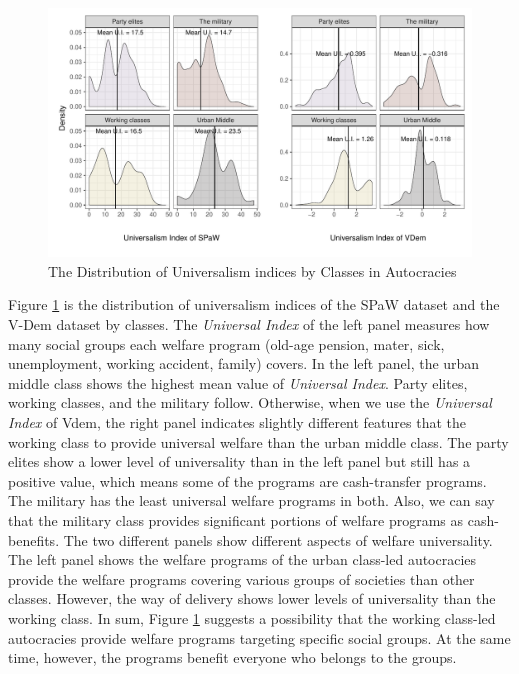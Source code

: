 \documentclass[11pt, notitlepage]{article}
\begin{document}
\begin{figure}[!htbt]
	\centering
	\includegraphics[width=1\linewidth]{"../3. Datasets_Codebooks/Figures/Plot2"}
	\caption{The Distribution of Universalism indices by Classes in Autocracies}
	\label{fig:plot3}
\end{figure}

Figure \ref{fig:plot3} is the distribution of universalism indices of the SPaW dataset and the V-Dem dataset by classes. The \textit{Universal Index} of the left panel measures how many social groups each welfare program (old-age pension, mater, sick, unemployment, working accident, family) covers. In the left panel, the urban middle class shows the highest mean value of \textit{Universal Index}. Party elites, working classes, and the military follow. Otherwise, when we use the \textit{Universal Index} of Vdem, the right panel indicates slightly different features that the working class to provide universal welfare than the urban middle class. The party elites show a lower level of universality than in the left panel but still has a positive value, which means some of the programs are cash-transfer programs. The military has the least universal welfare programs in both. Also, we can say that the military class provides significant portions of welfare programs as cash-benefits. The two different panels show different aspects of welfare universality. The left panel shows the welfare programs of the urban class-led autocracies provide the welfare programs covering various groups of societies than other classes. However, the way of delivery shows lower levels of universality than the working class. In sum, Figure \ref{fig:plot3} suggests a possibility that the working class-led autocracies provide welfare programs targeting specific social groups. At the same time, however, the programs benefit everyone who belongs to the groups.
\end{document}
